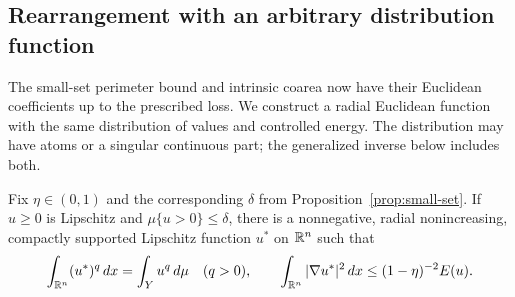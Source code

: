 \subsection{Rearrangement with an arbitrary distribution function}

The small-set perimeter bound and intrinsic coarea now have their
Euclidean coefficients up to the prescribed loss. We construct a radial
Euclidean function with the same distribution of values and controlled
energy. The distribution may have atoms or a singular continuous part;
the generalized inverse below includes both.

\begin{lemma}
\label{lem:rearranged-energy}
Fix $\eta\in(0,1)$ and the corresponding $\delta$ from
Proposition~\ref{prop:small-set}.  If $u\ge0$ is Lipschitz and
$\mu\{u>0\}\le\delta$, there is a nonnegative, radial nonincreasing,
compactly supported Lipschitz function $u^*$ on $\mathbb R^n$ such that
\begin{equation}
 \int_{\mathbb R^n}(u^*)^q\,d x=\int_Yu^q\,d\mu\quad(q>0),
 \qquad
 \int_{\mathbb R^n}|\nabla u^*|^2\,d x
       \le(1-\eta)^{-2}E(u).
 \label{eq:rearranged-energy-bound}
\end{equation}
\end{lemma}

